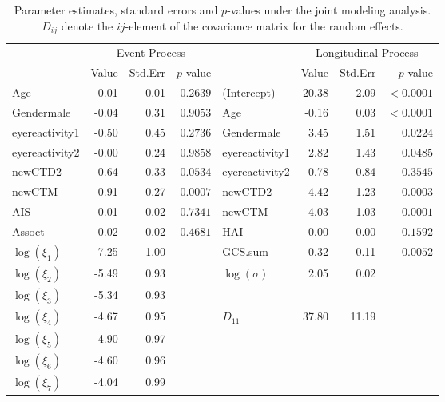 \documentclass{article}
\begin{document}
\begin{table}[H]
\centering
\begin{tabular}{lrrrlrrr}
  \hline
  & \multicolumn{3}{c}{Event Process} & & \multicolumn{3}{c}{Longitudinal Process}\\
  & Value & Std.Err & $p$-value &   & Value & Std.Err & $p$-value \\ 
  \hline
Age & -0.01 & 0.01 & $0.2639$ & (Intercept) & 20.38 & 2.09 & $<0.0001$ \\ 
  Gendermale & -0.04 & 0.31 & $0.9053$ & Age & -0.16 & 0.03 & $<0.0001$ \\ 
  eyereactivity1 & -0.50 & 0.45 & $0.2736$ & Gendermale & 3.45 & 1.51 & $0.0224$ \\ 
  eyereactivity2 & -0.00 & 0.24 & $0.9858$ & eyereactivity1 & 2.82 & 1.43 & $0.0485$ \\ 
  newCTD2 & -0.64 & 0.33 & $0.0534$ & eyereactivity2 & -0.78 & 0.84 & $0.3545$ \\ 
  newCTM & -0.91 & 0.27 & $0.0007$ & newCTD2 & 4.42 & 1.23 & $0.0003$ \\ 
  AIS & -0.01 & 0.02 & $0.7341$ & newCTM & 4.03 & 1.03 & $0.0001$ \\ 
  Assoct & -0.02 & 0.02 & $0.4681$ & HAI & 0.00 & 0.00 & $0.1592$ \\ 
  $\log(\xi_1)$ & -7.25 & 1.00 &  & GCS.sum & -0.32 & 0.11 & $0.0052$ \\ 
  $\log(\xi_2)$ & -5.49 & 0.93 &  & $\log(\sigma)$ & 2.05 & 0.02 &  \\ 
  $\log(\xi_3)$ & -5.34 & 0.93 &  &  &  &  &  \\ 
  $\log(\xi_4)$ & -4.67 & 0.95 &  & $D_{11}$ & 37.80 & 11.19 &  \\ 
  $\log(\xi_5)$ & -4.90 & 0.97 &  &  &  &  &  \\ 
  $\log(\xi_6)$ & -4.60 & 0.96 &  &  &  &  &  \\ 
  $\log(\xi_7)$ & -4.04 & 0.99 &  &  &  &  &  \\ 
   \hline
\end{tabular}
\caption{Parameter estimates, standard errors and $p$-values under the joint modeling analysis. $D_{ij}$ denote the $ij$-element of the covariance matrix for the random effects.} 
\end{table}



\end{document}

